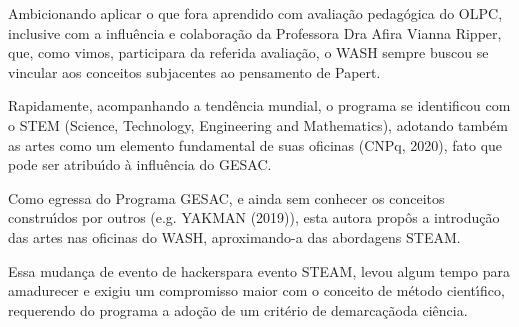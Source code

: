 \documentclass[
12pt,		%
openright,	%
twoside,  %
a4paper,			%
chapter=TITLE,		%
english,			%
french,				%
spanish,			%
brazil				%
]{USPSC-classe/USPSC}
\begin{document}
\noindent\begin{center}\mbox{\centering{}}\end{center}


Ambicionando aplicar o que fora aprendido com avalia\c{c}\~ao pedag\'ogica do OLPC, inclusive com a influ\^encia e colabora\c{c}\~ao da Professora Dra Afira Vianna Ripper, que, como vimos, participara da referida avalia\c{c}\~ao, o WASH sempre buscou se vincular aos conceitos subjacentes ao pensamento de Papert.

















Rapidamente, acompanhando a tend\^encia mundial, o programa se identificou com o STEM (Science, Technology, Engineering and Mathematics), adotando tamb\'em as artes como um elemento fundamental de suas oficinas  (CNPq, 2020), fato que pode ser atribu\'{\i}do \`a influ\^encia do GESAC.

















Como egressa do Programa GESAC, e ainda sem conhecer os conceitos constru\'{\i}dos por outros (e.g.  YAKMAN (2019)), esta autora prop\^os a introdu\c{c}\~ao das artes nas oficinas do WASH, aproximando-a das abordagens STEAM.

















Essa mudan\c{c}a de \textquotedbl evento de hackers\textquotedbl  para \textquotedbl evento STEAM\textquotedbl , levou algum tempo para amadurecer e exigiu um compromisso maior com o conceito de m\'etodo cient\'{\i}fico, requerendo do programa a ado\c{c}\~ao de um \textquotedbl crit\'erio de demarca\c{c}\~ao\textquotedbl  da ci\^encia.
\end{document}
